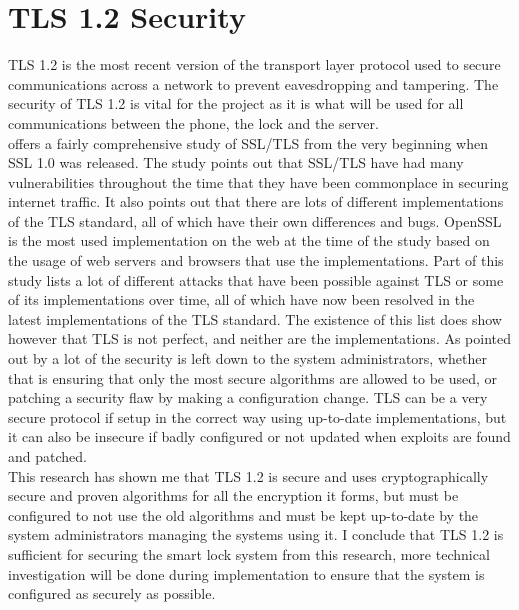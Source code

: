 \section{TLS 1.2 Security}
TLS 1.2 is the most recent version of the transport layer protocol used to secure communications across a network to prevent eavesdropping and tampering. The security of TLS 1.2 is vital for the project as it is what will be used for all communications between the phone, the lock and the server.
\\
\indent\cite{Meyer2014} offers a fairly comprehensive study of SSL/TLS from the very beginning when SSL 1.0 was released. The study points out that SSL/TLS have had many vulnerabilities throughout the time that they have been commonplace in securing internet traffic. It also points out that there are lots of different implementations of the TLS standard, all of which have their own differences and bugs. OpenSSL is the most used implementation on the web at the time of the study based on the usage of web servers and browsers that use the implementations. Part of this study lists a lot of different attacks that have been possible against TLS or some of its implementations over time, all of which have now been resolved in the latest implementations of the TLS standard. The existence of this list does show however that TLS is not perfect, and neither are the implementations. As pointed out by \cite{Turner2014} a lot of the security is left down to the system administrators, whether that is ensuring that only the most secure algorithms are allowed to be used, or patching a security flaw by making a configuration change. TLS can be a very secure protocol if setup in the correct way using up-to-date implementations, but it can also be insecure if badly configured or not updated when exploits are found and patched.
\\
\indent This research has shown me that TLS 1.2 is secure and uses cryptographically secure and proven algorithms for all the encryption it forms, but must be configured to not use the old algorithms and must be kept up-to-date by the system administrators managing the systems using it. I conclude that TLS 1.2 is sufficient for securing the smart lock system from this research, more technical investigation will be done during implementation to ensure that the system is configured as securely as possible.

